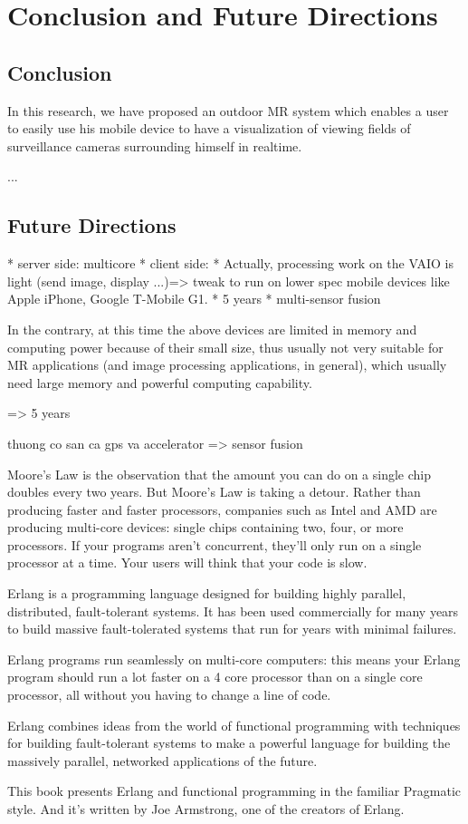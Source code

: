 \chapter{Conclusion and Future Directions}
\label{Chapter6}

\section{Conclusion}

In this research, we have proposed an outdoor MR system which enables a user to easily use his mobile device to have a visualization of viewing fields of surveillance cameras surrounding himself in realtime.

...

\section{Future Directions}


* server side: multicore
* client side:
	* Actually, processing work on the VAIO is light (send image, display ...)=> tweak to run on lower spec mobile devices like Apple iPhone, Google T-Mobile G1.
	* 5 years
* multi-sensor fusion


In the contrary, at this time the above devices are limited in memory and computing power because of their small size, thus usually not very suitable for MR applications (and image processing applications, in general), which usually need large memory and powerful computing capability.

=> 5 years

thuong co san ca gps va accelerator => sensor fusion

Moore's Law is the observation that the amount you can do on a single chip doubles every two years. But Moore's Law is taking a detour. Rather than producing faster and faster processors, companies such as Intel and AMD are producing multi-core devices: single chips containing two, four, or more processors. If your programs aren't concurrent, they'll only run on a single processor at a time. Your users will think that your code is slow.

Erlang is a programming language designed for building highly parallel, distributed, fault-tolerant systems. It has been used commercially for many years to build massive fault-tolerated systems that run for years with minimal failures.

Erlang programs run seamlessly on multi-core computers: this means your Erlang program should run a lot faster on a 4 core processor than on a single core processor, all without you having to change a line of code.

Erlang combines ideas from the world of functional programming with techniques for building fault-tolerant systems to make a powerful language for building the massively parallel, networked applications of the future.

This book presents Erlang and functional programming in the familiar Pragmatic style. And it's written by Joe Armstrong, one of the creators of Erlang.



